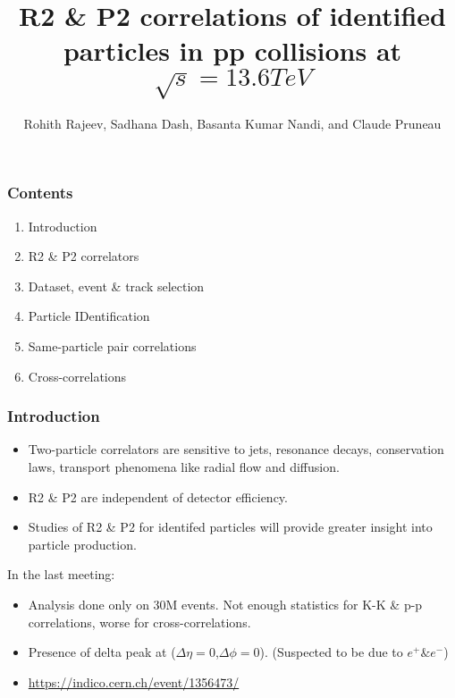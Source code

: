 \documentclass{beamer}
\title{R2 \& P2 correlations of identified particles in pp collisions at $\sqrt{s}=13.6 TeV$}
\author{Rohith Rajeev, Sadhana Dash, Basanta Kumar Nandi, and Claude Pruneau}
\begin{document}
\begin{frame}
	\titlepage
\end{frame}
\begin{frame}
	\frametitle{Contents}
	\begin{enumerate}
		\item Introduction
		\item R2 \& P2 correlators
		\item Dataset, event \& track selection
		\item Particle IDentification
		\item Same-particle pair correlations
		\item Cross-correlations
	\end{enumerate}
\end{frame}

\begin{frame}
	\frametitle{Introduction}
	\begin{itemize}
	\item	Two-particle correlators are sensitive to jets, resonance decays, conservation laws, transport phenomena like radial flow and diffusion.
	\item	R2 \& P2 are independent of detector efficiency.
	\item	Studies of R2 \& P2 for identifed particles will provide greater insight into particle production.\\
	\end{itemize}
\end{frame}
\begin{frame}
	{In the last meeting:}
	\begin{itemize}
		\item Analysis done only on 30M events. Not enough statistics for K-K \& p-p correlations, worse for cross-correlations.
		\item Presence of delta peak at ($\Delta\eta=0$,$\Delta\phi=0$). {\tiny(Suspected to be due to $e^+ \& e^-$)}
		\item \hyperlink{https://indico.cern.ch/event/1356473/}{https://indico.cern.ch/event/1356473/}
	\end{itemize}
\end{frame}
\end{document}
